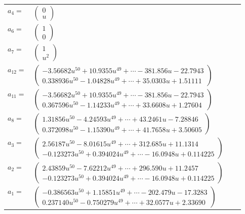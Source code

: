\documentclass[1p]{elsarticle_modified}
\theoremstyle{definition}
\begin{document}
\begin{tabular}{m{7pt} m{180pt} m{7pt} m{180pt} }
\flushright $a_{4}=$&$\begin{pmatrix}0\\u\end{pmatrix}$ \\
\flushright $a_{6}=$&$\begin{pmatrix}1\\0\end{pmatrix}$ \\
\flushright $a_{7}=$&$\begin{pmatrix}1\\u^2\end{pmatrix}$ \\
\flushright $a_{12}=$&$\begin{pmatrix}-3.56682 u^{50}+10.9355 u^{49}+\cdots-381.856 u-22.7943\\0.338936 u^{50}-1.04828 u^{49}+\cdots+35.0303 u+1.51111\end{pmatrix}$ \\
\flushright $a_{11}=$&$\begin{pmatrix}-3.56682 u^{50}+10.9355 u^{49}+\cdots-381.856 u-22.7943\\0.367596 u^{50}-1.14233 u^{49}+\cdots+33.6608 u+1.27604\end{pmatrix}$ \\
\flushright $a_{8}=$&$\begin{pmatrix}1.31856 u^{50}-4.24593 u^{49}+\cdots+43.2461 u-7.28846\\0.372098 u^{50}-1.15390 u^{49}+\cdots+41.7658 u+3.50605\end{pmatrix}$ \\
\flushright $a_{3}=$&$\begin{pmatrix}2.56187 u^{50}-8.01615 u^{49}+\cdots+312.685 u+11.1314\\-0.123273 u^{50}+0.394024 u^{49}+\cdots-16.0948 u+0.114225\end{pmatrix}$ \\
\flushright $a_{2}=$&$\begin{pmatrix}2.43859 u^{50}-7.62212 u^{49}+\cdots+296.590 u+11.2457\\-0.123273 u^{50}+0.394024 u^{49}+\cdots-16.0948 u+0.114225\end{pmatrix}$ \\
\flushright $a_{1}=$&$\begin{pmatrix}-0.386563 u^{50}+1.15851 u^{49}+\cdots-202.479 u-17.3283\\0.237140 u^{50}-0.750279 u^{49}+\cdots+32.0577 u+2.33690\end{pmatrix}$ \\

\end{tabular}
\end{document}
